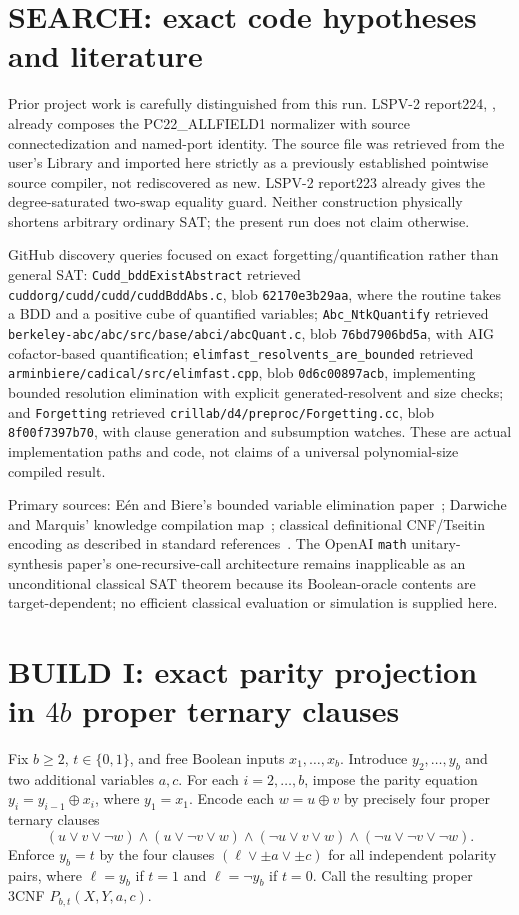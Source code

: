 \documentclass[11pt]{article}
\begin{document}
\section{SEARCH: exact code hypotheses and literature}
Prior project work is carefully distinguished from this run. LSPV-2 report224, , already composes the PC22\_ALLFIELD1 normalizer with source connectedization and named-port identity. The source file  was retrieved from the user's Library and imported here strictly as a previously established pointwise source compiler, not rediscovered as new. LSPV-2 report223 already gives the degree-saturated two-swap equality guard. Neither construction physically shortens arbitrary ordinary SAT; the present run does not claim otherwise.

GitHub discovery queries focused on exact forgetting/quantification rather than general SAT: \texttt{Cudd\_bddExistAbstract} retrieved \texttt{cuddorg/cudd/cudd/cuddBddAbs.c}, blob \texttt{62170e3b29aa}, where the routine takes a BDD and a positive cube of quantified variables; \texttt{Abc\_NtkQuantify} retrieved \texttt{berkeley-abc/abc/src/base/abci/abcQuant.c}, blob \texttt{76bd7906bd5a}, with AIG cofactor-based quantification; \texttt{elimfast\_resolvents\_are\_bounded} retrieved \texttt{arminbiere/cadical/src/elimfast.cpp}, blob \texttt{0d6c00897acb}, implementing bounded resolution elimination with explicit generated-resolvent and size checks; and \texttt{Forgetting} retrieved \texttt{crillab/d4/preproc/Forgetting.cc}, blob \texttt{8f00f7397b70}, with clause generation and subsumption watches. These are actual implementation paths and code, not claims of a universal polynomial-size compiled result.

Primary sources: E\'en and Biere's bounded variable elimination paper~\cite{eenbiere}; Darwiche and Marquis' knowledge compilation map~\cite{darwiche}; classical definitional CNF/Tseitin encoding as described in standard references~\cite{tseitin}. The OpenAI \texttt{math} unitary-synthesis paper's one-recursive-call architecture remains inapplicable as an unconditional classical SAT theorem because its Boolean-oracle contents are target-dependent; no efficient classical evaluation or simulation is supplied here.

\section{BUILD I: exact parity projection in $4b$ proper ternary clauses}
Fix $b\ge2$, $t\in\{0,1\}$, and free Boolean inputs $x_1,\ldots,x_b$. Introduce $y_2,\ldots,y_b$ and two additional variables $a,c$. For each $i=2,\ldots,b$, impose the parity equation $y_i=y_{i-1}\oplus x_i$, where $y_1=x_1$. Encode each $w=u\oplus v$ by precisely four proper ternary clauses
\[
 (u\vee v\vee\neg w)\land(u\vee\neg v\vee w)
 \land(\neg u\vee v\vee w)\land(\neg u\vee\neg v\vee\neg w).
\]
Enforce $y_b=t$ by the four clauses $(\ell\vee\pm a\vee\pm c)$ for all independent polarity pairs, where $\ell=y_b$ if $t=1$ and $\ell=\neg y_b$ if $t=0$. Call the resulting proper 3CNF $P_{b,t}(X,Y,a,c)$.
\end{document}
